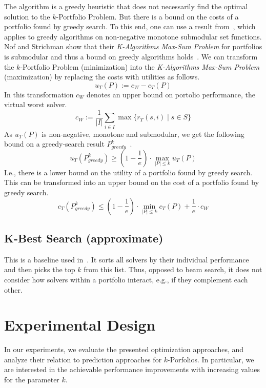 \documentclass[conference]{IEEEtran}
\begin{document}
The algorithm is a greedy heuristic that does not necessarily find the optimal solution to the $k$-Portfolio Problem. 
But there is a bound on the costs of a portfolio found by greedy search. 
To this end, one can use a result from~\cite{nemhauser1978analysis}, which applies to greedy algorithms on non-negative monotone submodular set functions.
Nof and Strichman show that their \emph{K-Algorithms Max-Sum Problem} for portfolios is submodular and thus a bound on greedy algorithms holds~\cite{nof2020real}. 
We can transform the $k$-Portfolio Problem (minimization) into the \emph{K-Algorithms Max-Sum Problem} (maximization) by replacing the costs with utilities as follows.%
$$
u_{T}(P) := c_W - c_{T}(P)
$$
In this transformation $c_W$ denotes an upper bound on portolio performance, the virtual worst solver.%
$$
c_W := \frac{1}{|I|} \sum_{i \in I}{\max\{{r_T(s,i) \mid s \in S}}\}
$$
As $u_{T}(P)$ is non-negative, monotone and submodular, we get the following bound on a greedy-search result $P_{greedy}^k$~\cite{nemhauser1978analysis, krause2014submodular}.%
$$
	u_{T}(P_{greedy}^k) \geq (1 - \frac{1}{e}) \cdot \max_{|P| \leq k}{u_{T}(P)}
$$
I.e., there is a lower bound on the utility of a portfolio found by greedy search.
This can be transformed into an upper bound on the cost of a portfolio found by greedy search.%
$$
	c_{T}(P_{greedy}^k) \leq (1 - \frac{1}{e}) \cdot \min_{|P| \leq k}{c_{T}(P)} + \frac{1}{e} \cdot c_W
$$

\subsection{K-Best Search (approximate)}

This is a baseline used in~\cite{nof2020real}.
It sorts all solvers by their individual performance and then picks the top $k$ from this list.
Thus, opposed to beam search, it does not consider how solvers within a portfolio interact, e.g., if they complement each other.


\section{Experimental Design}
\label{sec:experimental-design}

In our experiments, we evaluate the presented optimization approaches, and analyze their relation to prediction approaches for $k$-Porfolios. 
In particular, we are interested in the achievable performance improvements with increasing values for the parameter $k$. 
\end{document}
